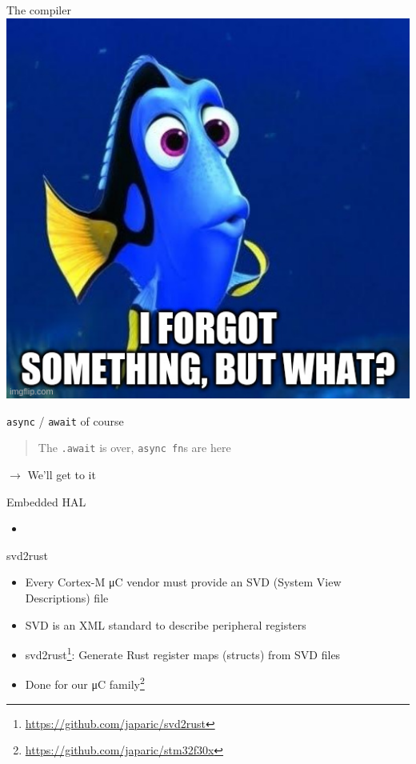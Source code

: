 \documentclass[aspectratio=1610,14pt,t]{beamer}
\begin{document}
\begin{frame}[c]{The compiler}
  \includegraphics[height=0.8\textheight]{img/did-i-forget-something.jpg}
\end{frame}

\begin{frame}[c]{\texttt{async} / \texttt{await} of course}

  \begin{quote}
    The \texttt{.await} is over, \texttt{async fn}s are here
  \end{quote}

  $\rightarrow$ We'll get to it
\end{frame}

\begin{frame}[c]{Embedded HAL}
  \begin{itemize}
  \item
  \end{itemize}
\end{frame}

\begin{frame}[c]{svd2rust}
  \begin{itemize}
    \item Every Cortex-M μC vendor must provide an SVD (System View
      Descriptions) file
    \item SVD is an XML standard to describe peripheral registers
    \item svd2rust\footnote{\url{https://github.com/japaric/svd2rust}}:
      Generate Rust register maps (structs) from SVD files
    \item Done for our μC family\footnote{\url{https://github.com/japaric/stm32f30x}}
  \end{itemize}
\end{frame}
\end{document}
